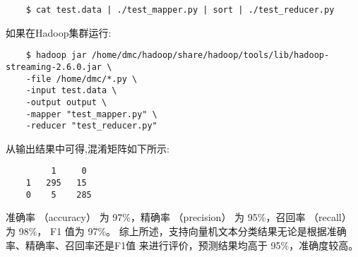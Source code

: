 \begin{lstlisting}
	$ cat test.data | ./test_mapper.py | sort | ./test_reducer.py
\end{lstlisting}
如果在Hadoop集群运行:

\begin{lstlisting}
	$ hadoop jar /home/dmc/hadoop/share/hadoop/tools/lib/hadoop-streaming-2.6.0.jar \
	-file /home/dmc/*.py \
	-input test.data \
	-output output \
	-mapper "test_mapper.py" \
	-reducer "test_reducer.py"
\end{lstlisting}
从输出结果中可得,混淆矩阵如下所示:

\begin{lstlisting}
	     1     0
	1   295   15
	0    5    285
\end{lstlisting}

准确率 （accuracy） 为 97\%，精确率 （precision） 为 95\%，召回率 （recall） 为 98\%，
F1 值为 97\%。
综上所述，支持向量机文本分类结果无论是根据准确率、精确率、召回率还是F1值
来进行评价，预测结果均高于 95\%，准确度较高。
